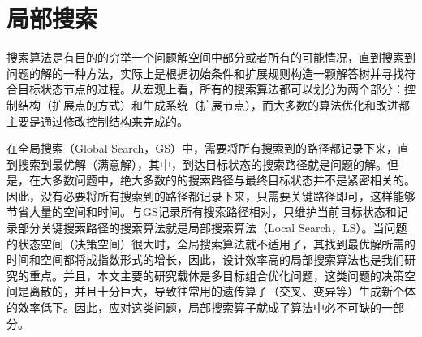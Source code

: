 \section{局部搜索}
\label{sec:背景介绍:局部搜索}
搜索算法是有目的的穷举一个问题解空间中部分或者所有的可能情况，直到搜索到问题的解的一种方法，实际上是根据初始条件和扩展规则构造一颗解答树并寻找符合目标状态节点的过程。从宏观上看，所有的搜索算法都可以划分为两个部分：控制结构（扩展点的方式）和生成系统（扩展节点），而大多数的算法优化和改进都主要是通过修改控制结构来完成的。
\par
在全局搜索（Global Search，GS）中，需要将所有搜索到的路径都记录下来，直到搜索到最优解（满意解），其中，到达目标状态的搜索路径就是问题的解。但是，在大多数问题中，绝大多数的的搜索路径与最终目标状态并不是紧密相关的。因此，没有必要将所有搜索到的路径都记录下来，只需要关键路径即可，这样能够节省大量的空间和时间。与GS记录所有搜索路径相对，只维护当前目标状态和记录部分关键搜索路径的搜索算法就是局部搜索算法（Local Search，LS）。当问题的状态空间（决策空间）很大时，全局搜索算法就不适用了，其找到最优解所需的时间和空间都将成指数形式的增长，因此，设计效率高的局部搜索算法也是我们研究的重点。并且，本文主要的研究载体是多目标组合优化问题，这类问题的决策空间是离散的，并且十分巨大，导致往常用的遗传算子（交叉、变异等）生成新个体的效率低下。因此，应对这类问题，局部搜索算子就成了算法中必不可缺的一部分。

